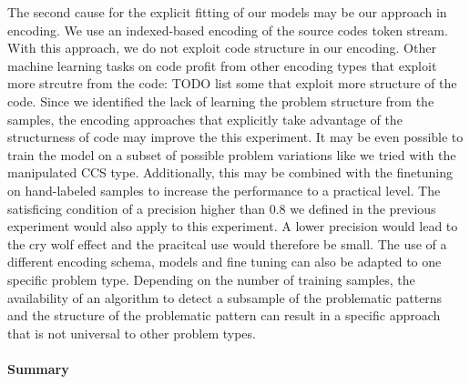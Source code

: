The second cause for the explicit fitting of our models may be our approach in encoding. We use an indexed-based encoding of the source codes token stream. With this approach, we do not exploit code structure in our encoding. Other machine learning tasks on code profit from other encoding types that exploit more strcutre from the code: TODO list some that exploit more structure of the code. Since we identified the lack of learning the problem structure from the samples, the encoding approaches that explicitly take advantage of the structurness of code may improve the this experiment. It may be even possible to train the model on a subset of possible problem variations like we tried with the manipulated CCS type. Additionally, this may be combined with the finetuning on hand-labeled samples to increase the performance to a practical level. The satisficing condition of a precision higher than 0.8 we defined in the previous experiment would also apply to this experiment. A lower precision would lead to the cry wolf effect and the pracitcal use would therefore be small.
The use of a different encoding schema, models and fine tuning can also be adapted to one specific problem type. Depending on the number of training samples, the availability of an algorithm to detect a subsample of the problematic patterns and the structure of the problematic pattern can result in a specific approach that is not universal to other problem types.

\paragraph{Summary}




